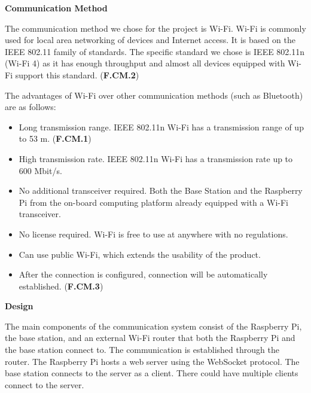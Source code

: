 \textbf{Communication Method}

The communication method we chose for the project is Wi-Fi. Wi-Fi is commonly used for local area networking of devices and Internet access. It is based on the IEEE 802.11 family of standards. The specific standard we chose is IEEE 802.11n (Wi-Fi 4) as it has enough throughput and almost all devices equipped with Wi-Fi support this standard. (\textbf{F.CM.2})

The advantages of Wi-Fi over other communication methods (such as Bluetooth) are as follows:
\begin{itemize}
    \item Long transmission range. IEEE 802.11n Wi-Fi has a transmission range of up to 53 m. (\textbf{F.CM.1})
    \item High transmission rate. IEEE 802.11n Wi-Fi has a transmission rate up to 600 Mbit/s.
    \item No additional transceiver required. Both the Base Station and the Raspberry Pi from the on-board computing platform already equipped with a Wi-Fi transceiver.
    \item No license required. Wi-Fi is free to use at anywhere with no regulations.
    \item Can use public Wi-Fi, which extends the usability of the product.
    \item After the connection is configured, connection will be automatically established. (\textbf{F.CM.3})
\end{itemize}

\textbf{Design}

The main components of the communication system consist of the Raspberry Pi, the base station, and an external Wi-Fi router that both the Raspberry Pi and the base station connect to. The communication is established through the router. The Raspberry Pi hosts a web server using the WebSocket protocol. The base station connects to the server as a client. There could have multiple clients connect to the server.
